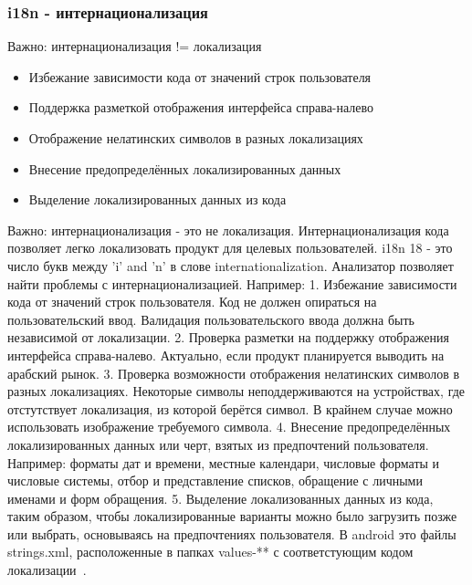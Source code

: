 \documentclass{../industrial-development}
\begin{document}
\begin{frame} \frametitle{i18n - интернационализация}
	\begin{block}{}
		\alert{Важно}: интернационализация != локализация
	\end{block}
	\begin{itemize}
		\item Избежание зависимости кода от значений строк пользователя
		\item Поддержка разметкой отображения интерфейса справа-налево
		\item Отображение нелатинских символов в разных локализациях
		\item Внесение предопределённых локализированных данных
		\item Выделение локализированных данных из кода
	\end{itemize}
\end{frame}
\lecturenotes
Важно: интернационализация - это не локализация.
Интернационализация кода позволяет легко локализовать продукт для целевых пользователей. i18n 18 - это число букв между 'i' and 'n' в слове internationalization.
Анализатор позволяет найти проблемы с интернационализацией. Например:
1. Избежание зависимости кода от значений строк пользователя.
Код не должен опираться на пользовательский ввод. Валидация пользовательского ввода должна быть независимой от локализации.
2. Проверка разметки на поддержку отображения интерфейса справа-налево.
Актуально, если продукт планируется выводить на арабский рынок.
3. Проверка возможности отображения нелатинских символов в разных локализациях.
Некоторые символы неподдерживаются на устройствах, где отстутствует локализация, из которой берётся символ. В крайнем случае можно использовать изображение требуемого символа.
4. Внесение предопределённых локализированных данных или черт, взятых из предпочтений пользователя. Например: форматы дат и времени, местные календари, числовые форматы и числовые системы, отбор и представление списков, обращение с личными именами и форм обращения.
5. Выделение локализованных данных из кода, таким образом, чтобы локализированные варианты можно было загрузить позже или выбрать, основываясь на предпочтениях пользователя. В android это файлы strings.xml, расположенные в папках values-** с соответстующим кодом локализации~\cite{i18n}.
\end{document}
